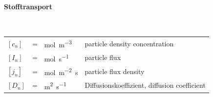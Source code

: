 \documentclass[a4paper, 10pt]{scrartcl}
\begin{document}
\begin{multicols}{2}
\begin{tabularx}{\linewidth}{lclX}
			
		\end{tabularx}
		\paragraph{Stofftransport}~\\
		\begin{tabularx}{\linewidth}{lclX}
			$[c_n]$ &=& \si{\mole\per\meter\cubed} & particle density concentration\\
			$[I_n]$ &=& \si{\mole\per\second} & particle flux\\
			$[j_n]$ &=& \si{\mole\per\meter\squared\second} & particle flux density\\
			$[D_n]$ &=& \si{\meter\squared\per\second} & Diffusionskoeffizient, diffusion coefficient\\
			
			
		\end{tabularx}
		
	\end{multicols}
	
\end{document}

